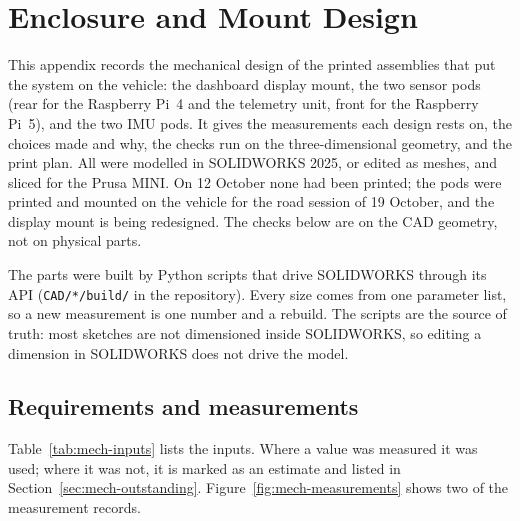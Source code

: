 \chapter{Enclosure and Mount Design}
\label{app:mechanical}

This appendix records the mechanical design of the printed assemblies that put the system on the vehicle: the dashboard display mount, the two sensor pods (rear for the Raspberry Pi~4 and the telemetry unit, front for the Raspberry Pi~5), and the two IMU pods. It gives the measurements each design rests on, the choices made and why, the checks run on the three-dimensional geometry, and the print plan. All were modelled in SOLIDWORKS 2025, or edited as meshes, and sliced for the Prusa MINI. On 12 October none had been printed; the pods were printed and mounted on the vehicle for the road session of 19 October, and the display mount is being redesigned. The checks below are on the CAD geometry, not on physical parts.

The parts were built by Python scripts that drive SOLIDWORKS through its API (\texttt{CAD/*/build/} in the repository). Every size comes from one parameter list, so a new measurement is one number and a rebuild. The scripts are the source of truth: most sketches are not dimensioned inside SOLIDWORKS, so editing a dimension in SOLIDWORKS does not drive the model.

\section{Requirements and measurements}
\label{sec:mech-requirements}

Table~\ref{tab:mech-inputs} lists the inputs. Where a value was measured it was used; where it was not, it is marked as an estimate and listed in Section~\ref{sec:mech-outstanding}. Figure~\ref{fig:mech-measurements} shows two of the measurement records.

